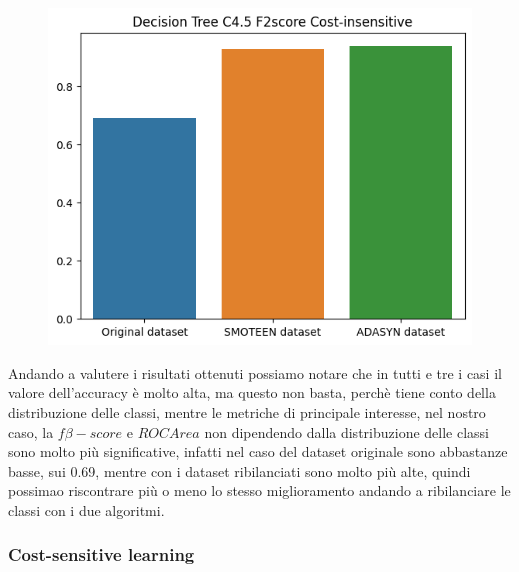 \documentclass[italian,12pt,a4paper]{article}
\begin{document}
\begin{center}
		\begin{figure}[h]
			\centering
			\includegraphics[scale=0.73]{DecTree}
		\end{figure}
	
	
	\end{center}
	
	Andando a valutere i risultati ottenuti possiamo notare che in tutti e tre i casi il valore dell'accuracy è molto alta, ma questo non basta, perchè tiene conto della distribuzione delle classi, mentre le metriche di principale interesse, nel nostro caso, la $f\beta-score$ e $ROC Area$ non dipendendo dalla distribuzione delle classi sono molto più significative, infatti nel caso del dataset originale sono abbastanze basse, sui 0.69, mentre con i dataset ribilanciati sono molto più alte, quindi possimao riscontrare più o meno lo stesso miglioramento andando a ribilanciare le classi con i due algoritmi. \\
	\linebreak
	\linebreak
	
	\subsubsection{Cost-sensitive learning}
	
\end{document}
